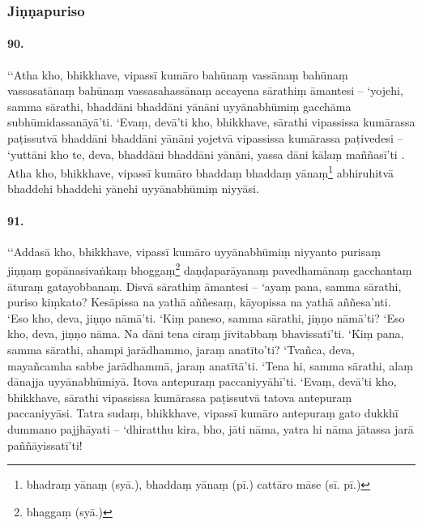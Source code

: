 
\subsubsection{Jiṇṇapuriso}

\paragraph{90.} ‘‘Atha kho, bhikkhave, vipassī kumāro bahūnaṃ vassānaṃ bahūnaṃ vassasatānaṃ bahūnaṃ vassasahassānaṃ accayena sārathiṃ āmantesi – ‘yojehi, samma sārathi, bhaddāni bhaddāni yānāni uyyānabhūmiṃ gacchāma subhūmidassanāyā’ti. ‘Evaṃ, devā’ti kho, bhikkhave, sārathi vipassissa kumārassa paṭissutvā bhaddāni bhaddāni yānāni yojetvā vipassissa kumārassa paṭivedesi – ‘yuttāni kho te, deva, bhaddāni bhaddāni yānāni, yassa dāni kālaṃ maññasī’ti . Atha kho, bhikkhave, vipassī kumāro bhaddaṃ bhaddaṃ yānaṃ\footnote{bhadraṃ yānaṃ (syā.), bhaddaṃ yānaṃ (pī.) cattāro māse (sī. pī.)} abhiruhitvā bhaddehi bhaddehi yānehi uyyānabhūmiṃ niyyāsi.

\paragraph{91.} ‘‘Addasā kho, bhikkhave, vipassī kumāro uyyānabhūmiṃ niyyanto purisaṃ jiṇṇaṃ gopānasivaṅkaṃ bhoggaṃ\footnote{bhaggaṃ (syā.)} daṇḍaparāyanaṃ pavedhamānaṃ gacchantaṃ āturaṃ gatayobbanaṃ. Disvā sārathiṃ āmantesi – ‘ayaṃ pana, samma sārathi, puriso kiṃkato? Kesāpissa na yathā aññesaṃ, kāyopissa na yathā aññesa’nti. ‘Eso kho, deva, jiṇṇo nāmā’ti. ‘Kiṃ paneso, samma sārathi, jiṇṇo nāmā’ti? ‘Eso kho, deva, jiṇṇo nāma. Na dāni tena ciraṃ jīvitabbaṃ bhavissatī’ti. ‘Kiṃ pana, samma sārathi, ahampi jarādhammo, jaraṃ anatīto’ti? ‘Tvañca, deva, mayañcamha sabbe jarādhammā, jaraṃ anatītā’ti. ‘Tena hi, samma sārathi, alaṃ dānajja uyyānabhūmiyā. Itova antepuraṃ paccaniyyāhī’ti. ‘Evaṃ, devā’ti kho, bhikkhave, sārathi vipassissa kumārassa paṭissutvā tatova antepuraṃ paccaniyyāsi. Tatra sudaṃ, bhikkhave, vipassī kumāro antepuraṃ gato dukkhī dummano pajjhāyati – ‘dhiratthu kira, bho, jāti nāma, yatra hi nāma jātassa jarā paññāyissatī’ti!

